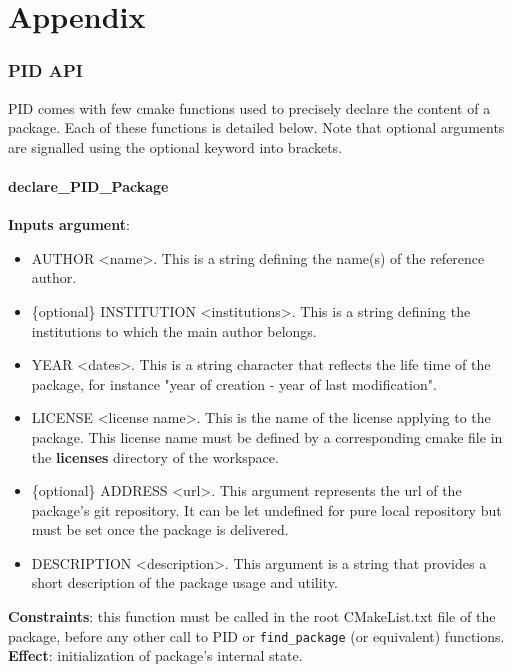 \documentclass[12pt,a4paper]{article}
\begin{document}
\pagebreak

\part*{Appendix}

\section{PID API}
\label{sec:PIDCMakefunctionsAPI}

PID comes with few cmake functions used to precisely declare the content of a package. Each of these functions is detailed below. Note that optional arguments are signalled using the optional keyword into brackets.

\subsection{declare\_PID\_Package}

\textbf{Inputs argument}: 
\begin{itemize}
\item AUTHOR <name>. This is a string defining the name(s) of the reference author.
\item \{optional\} INSTITUTION <institutions>. This is a string defining the institutions to which the main author belongs.
\item YEAR <dates>. This is a string character that reflects the life time of the package, for instance "year of creation - year of last modification".
\item LICENSE <license name>. This is the name of the license applying to the package. This license name must be defined by a corresponding cmake file in the \textbf{licenses} directory of the workspace.
\item \{optional\} ADDRESS <url>. This argument represents the url of the package's git repository. It can be let undefined for pure local repository but must be set once the package is delivered.
\item DESCRIPTION <description>. This argument is a string that provides a short description of the package usage and utility.
\end{itemize}
\textbf{Constraints}: this function must be called in the root CMakeList.txt file of the package, before any other call to PID or \texttt{find\_package} (or equivalent) functions.\\
\textbf{Effect}: initialization of package's internal state.
\end{document}
